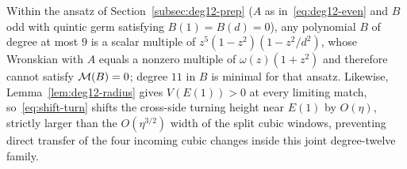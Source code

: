 \begin{remark}\label{rem:deg12-obstruction}
Within the ansatz of Section~\ref{subsec:deg12-prep} ($A$ as in~\eqref{eq:deg12-even} and $B$ odd with quintic germ satisfying $B(1)=B(d)=0$), any polynomial $B$ of degree at most $9$ is a scalar multiple of $z^5(1-z^2)(1-z^2/d^2)$, whose Wronskian with $A$ equals a nonzero multiple of $\omega(z)(1+z^2)$ and therefore cannot satisfy $\mathcal{M}(B)=0$; degree $11$ in $B$ is minimal for that ansatz. Likewise, Lemma~\ref{lem:deg12-radius} gives $V(E(1))>0$ at every limiting match, so~\eqref{eq:shift-turn} shifts the cross-side turning height near $E(1)$ by $O(\eta)$, strictly larger than the $O(\eta^{3/2})$ width of the split cubic windows, preventing direct transfer of the four incoming cubic changes inside this joint degree-twelve family.
\end{remark}
